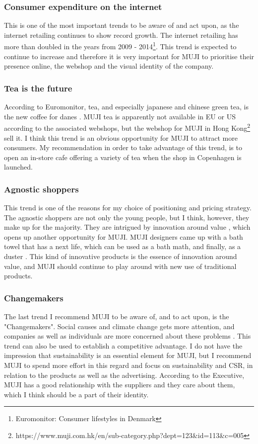 \subsubsection{Consumer expenditure on the internet}
This is one of the most important trends to be aware of and act upon, as the internet retailing continues to show record growth. The internet retailing has more than doubled in the years from 2009 - 2014\footnote{Euromonitor: Consumer lifestyles in Denmark}. This trend is expected to continue to increase and therefore it is very important for MUJI to prioritise their presence online, the webshop and the visual identity of the company.  

\subsubsection{Tea is the future}
According to Euromonitor, tea, and especially japanese and chinese green tea, is the new coffee for danes \cite[29]{ConsumerLifestyles}. MUJI tea is apparently not available in EU or US according to the associated webshops, but the webshop for MUJI in Hong Kong\footnote{https://www.muji.com.hk/en/sub-category.php?dept=123&id=113&c=005} sell it. I think this trend is an obvious opportunity for MUJI to attract more consumers. My recommendation in order to take advantage of this trend, is to open an in-store cafe offering a variety of tea when the shop in Copenhagen is launched.  

\subsubsection{Agnostic shoppers}
This trend is one of the reasons for my choice of positioning and pricing strategy. The agnostic shoppers are not only the young people, but I think, however, they make up for the majority. They are intrigued by innovation around value \cite[3]{Top10Trends}, which opens up another opportunity for MUJI. MUJI designers came up with a bath towel that has a next life, which can be used as a bath math, and finally, as a duster \cite{FutureGrowth}. This kind of innovative products is the essence of innovation around value, and MUJI should continue to play around with new use of traditional products.   

\subsubsection{Changemakers}
The last trend I recommend MUJI to be aware of, and to act upon, is the "Changemakers". Social causes and climate change gets more attention, and companies as well as individuals are more concerned about these problems \cite[14-17]{Top10Trends}. This trend can also be used to establish a competitive advantage. I do not have the impression that sustainability is an essential element for MUJI, but I recommend MUJI to spend more effort in this regard and focus on sustainability and CSR, in relation to the products as well as the advertising. According to the Executive, MUJI has a good relationship with the suppliers and they care about them\cite{FutureGrowth}, which I think should be a part of their identity.